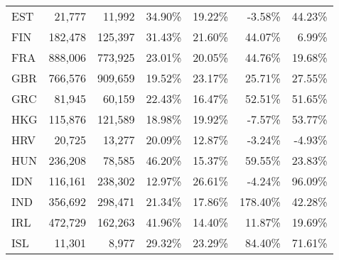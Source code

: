 \documentclass[a4paper,11pt]{article}
\begin{document}
\begin{table}[h]
\begin{tabular}{lrrrrrr}
    EST   & 21,777 & 11,992 & 34.90\% & 19.22\% & -3.58\% & 44.23\% \\
    FIN   & 182,478 & 125,397 & 31.43\% & 21.60\% & 44.07\% & 6.99\% \\
    FRA   & 888,006 & 773,925 & 23.01\% & 20.05\% & 44.76\% & 19.68\% \\
    GBR   & 766,576 & 909,659 & 19.52\% & 23.17\% & 25.71\% & 27.55\% \\
    GRC   & 81,945 & 60,159 & 22.43\% & 16.47\% & 52.51\% & 51.65\% \\
    HKG   & 115,876 & 121,589 & 18.98\% & 19.92\% & -7.57\% & 53.77\% \\
    HRV   & 20,725 & 13,277 & 20.09\% & 12.87\% & -3.24\% & -4.93\% \\
    HUN   & 236,208 & 78,585 & 46.20\% & 15.37\% & 59.55\% & 23.83\% \\
    IDN   & 116,161 & 238,302 & 12.97\% & 26.61\% & -4.24\% & 96.09\% \\
    IND   & 356,692 & 298,471 & 21.34\% & 17.86\% & 178.40\% & 42.28\% \\
    IRL   & 472,729 & 162,263 & 41.96\% & 14.40\% & 11.87\% & 19.69\% \\
    ISL   & 11,301 & 8,977 & 29.32\% & 23.29\% & 84.40\% & 71.61\% \\
    \end{tabular}
\end{table}

\newpage
\end{document}

